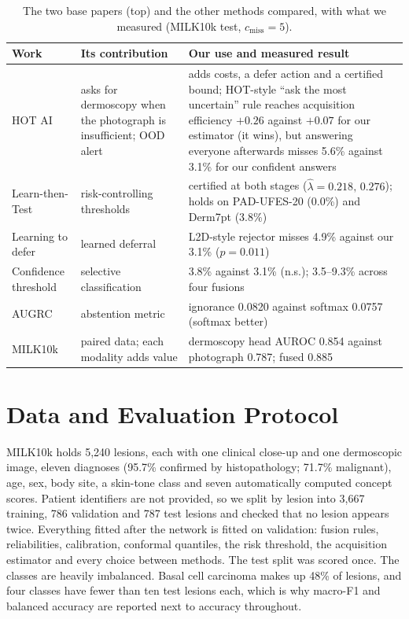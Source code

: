 \documentclass[conference]{IEEEtran}
\begin{document}
\begin{table}[!t]
\caption{The two base papers (top) and the other methods compared, with what we measured (MILK10k test, $c_{\mathrm{miss}}=5$).}
\label{tab:base}
\centering\footnotesize
\begin{tabular}{p{2.0cm}p{3.2cm}p{10.2cm}}
\toprule
Work & Its contribution & Our use and measured result \\
\midrule
HOT AI \cite{r2} & asks for dermoscopy when the photograph is insufficient; OOD alert & adds costs, a defer action and a certified bound; HOT-style ``ask the most uncertain'' rule reaches acquisition efficiency $+0.26$ against $+0.07$ for our estimator (it wins), but answering everyone afterwards misses 5.6\% against 3.1\% for our confident answers \\
Learn-then-Test \cite{r3} & risk-controlling thresholds & certified at both stages ($\hat\lambda=0.218,\,0.276$); holds on PAD-UFES-20 (0.0\%) and Derm7pt (3.8\%) \\
Learning to defer \cite{r25} & learned deferral & L2D-style rejector misses 4.9\% against our 3.1\% ($p=0.011$) \\
Confidence threshold \cite{r24} & selective classification & 3.8\% against 3.1\% (n.s.); 3.5--9.3\% across four fusions \\
AUGRC \cite{r7} & abstention metric & ignorance 0.0820 against softmax 0.0757 (softmax better) \\
MILK10k \cite{r4,r5} & paired data; each modality adds value & dermoscopy head AUROC 0.854 against photograph 0.787; fused 0.885 \\
\bottomrule
\end{tabular}
\end{table}

\section{Data and Evaluation Protocol}
MILK10k \cite{r4} holds 5,240 lesions, each with one clinical close-up and one dermoscopic image, eleven diagnoses (95.7\% confirmed by histopathology; 71.7\% malignant), age, sex, body site, a skin-tone class and seven automatically computed concept scores. Patient identifiers are not provided, so we split by lesion into 3,667 training, 786 validation and 787 test lesions and checked that no lesion appears twice. Everything fitted after the network is fitted on validation: fusion rules, reliabilities, calibration, conformal quantiles, the risk threshold, the acquisition estimator and every choice between methods. The test split was scored once. The classes are heavily imbalanced. Basal cell carcinoma makes up 48\% of lesions, and four classes have fewer than ten test lesions each, which is why macro-F1 and balanced accuracy are reported next to accuracy throughout.
\end{document}
